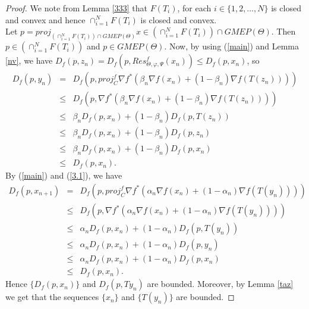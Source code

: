 \documentclass[reqno,b5paper]{amsart}
\theoremstyle{plain}
\theoremstyle{definition}
\numberwithin{equation}{section}
\numberwithin{equation}{section}
\begin{document}
\begin{proof}
We note from Lemma \ref{333} that $F(T_{i})$, for each $i\in\{1,2,\ldots,N\}$ is closed and convex and hence $\cap_{i=1}^{N}F(T_{i})$ is closed and convex. \\
 Let $p=proj_{(\cap_{i=1}^{N}F(T_{i}))\cap GMEP(\Theta)}x\in (\cap_{i=1}^{N}F(T_{i}))\cap GMEP(\Theta)$. Then $p\in (\cap_{i=1}^{N}F(T_{i}))$ and $p\in GMEP(\Theta)$. Now, by using (\ref{main}) and Lemma \ref{nv}, we have $D_{f}(p,z_{n})=D_{f}(p,Res_{\Theta,\varphi,\Psi}^{f}(x_{n}))\leq D_{f}(p,x_{n})$, so
\begin{eqnarray}
D_{f}(p,y_{n})&=&D_{f}(p,proj_{C}^{f}\nabla f^{*}(\beta_{n}\nabla f(x_{n})+(1-\beta_{n})\nabla f(T(z_{n}))))\nonumber\\
&\leq&D_{f}(p,\nabla f^{*}(\beta_{n}\nabla f(x_{n})+(1-\beta_{n})\nabla f(T(z_{n}))))\nonumber\\
&\leq &\beta_{n}D_{f}(p,x_{n})+(1-\beta_{n})D_{f}(p,T(z_{n}))\nonumber\\
&\leq&\beta_{n}D_{f}(p,x_{n})+(1-\beta_{n})D_{f}(p,z_{n})\nonumber\\
&\leq &\beta_{n}D_{f}(p,x_{n})+(1-\beta_{n})D_{f}(p,x_{n})\nonumber\\
&\leq & D_{f}(p,x_{n}).\label{3.1}
\end{eqnarray} 
 By (\ref{main}) and (\ref{3.1}), we have 
\begin{eqnarray*}
D_{f}(p,x_{n+1})&=&D_{f}(p,proj_{C}^{f}\nabla f^{*}(\alpha_{n}\nabla f(x_{n})+(1-\alpha_{n})\nabla f (T(y_{n}))))\\
&\leq&D_{f}(p,\nabla f^{*}(\alpha_{n}\nabla f(x_{n})+(1-\alpha_{n})\nabla f (T(y_{n}))))\\
&\leq& \alpha_{n}D_{f}(p,x_{n})+(1-\alpha_{n})D_{f}(p,T(y_{n}))\\
&\leq& \alpha_{n}D_{f}(p,x_{n})+(1-\alpha_{n})D_{f}(p,y_{n})\\
&\leq& \alpha_{n}D_{f}(p,x_{n})+(1-\alpha_{n})D_{f}(p,x_{n})\\
&\leq& D_{f}(p,x_{n}).
\end{eqnarray*}
Hence $\{D_{f}(p,x_{n})\}$ and $D_{f}(p,Ty_{n})$  are bounded. Moreover, by Lemma \ref{taz} we get that the sequences $\{x_{n}\}$ and $\{T(y_{n})\}$ are bounded. 


\end{proof}
\end{document}
